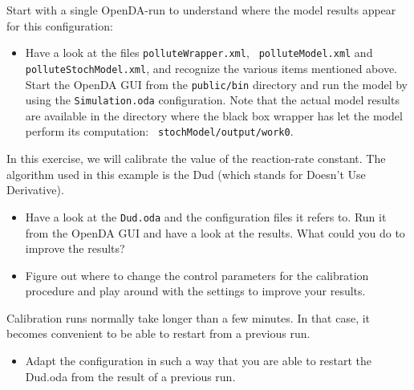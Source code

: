 Start with a single OpenDA-run to understand where the model results appear
for this configuration:
\begin{itemize}
 \item Have a look at the files {\tt polluteWrapper.xml}, {\tt
   polluteModel.xml} and {\tt polluteStochModel.xml}, and recognize the various
   items mentioned above. Start the OpenDA GUI from the {\tt public/bin}
   directory and run the model by using the {\tt Simulation.oda} configuration.
   Note that the actual model results are available in the directory where the
   black box wrapper has let the model perform its computation: {\tt
     stochModel/output/work0}.
\end{itemize}

In this exercise, we will calibrate the value of the reaction-rate constant.
The algorithm used in this example is the Dud (which stands for Doesn't Use
Derivative).

\begin{itemize}
\item Have a look at the {\tt Dud.oda} and the configuration files it refers
  to. Run it from the OpenDA GUI and have a look at the results. What could you
  do to improve the results?

\item Figure out where to change the control parameters for the calibration
  procedure and play around with the settings to improve your results.

\end{itemize}

Calibration runs normally take longer than a few minutes. In that case, it
becomes convenient to be able to restart from a previous run.

\begin{itemize}
\item Adapt the configuration in such a way that you are able to restart the
  Dud.oda from the result of a previous run.
\end{itemize}
